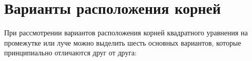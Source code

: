 \section {Варианты расположения корней}

При рассмотрении вариантов расположения корней квадратного уравнения на промежутке или луче можно
выделить шесть основных вариантов, которые принципиально отличаются друг от друга:


